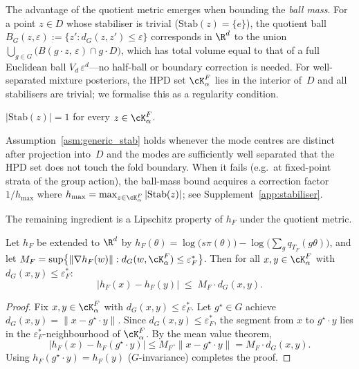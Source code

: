 The advantage of the quotient metric emerges when bounding the
\emph{ball mass}.  For a point $z \in D$ whose stabiliser is trivial
($\mathrm{Stab}(z) = \{e\}$), the quotient ball
$B_G(z, \varepsilon) := \{z' : d_G(z, z') \leq \varepsilon\}$
corresponds in $\R^d$ to the union
$\bigcup_{g \in G}\bigl(B(g\!\cdot\!z,\,\varepsilon) \cap g\!\cdot\!D\bigr)$,
which has total volume equal to that of a full Euclidean ball
$V_d\,\varepsilon^d$---no half-ball or boundary correction is
needed.  For well-separated mixture posteriors, the HPD set
$\cK_\alpha^F$ lies in the interior of~$D$ and all stabilisers are
trivial; we formalise this as a regularity condition.

\begin{assumption}\label{asm:generic_stab}
  $|\mathrm{Stab}(z)| = 1$ for every $z \in \cK_\alpha^F$.
\end{assumption}

\noindent
Assumption~\ref{asm:generic_stab} holds whenever the mode centres are
distinct after projection into~$D$ and the modes are sufficiently
well separated that the HPD set does not touch the fold boundary.
When it fails (e.g.\ at fixed-point strata of the group action),
the ball-mass bound acquires a correction factor
$1/h_{\max}$ where
$h_{\max} = \max_{z \in \cK_\alpha^F} |\mathrm{Stab}(z)|$;
see Supplement~\ref{app:stabiliser}.

The remaining ingredient is a Lipschitz property of $h_F$ under
the quotient metric.

\begin{lemma}\label{lem:lip_quotient}
  Let $h_F$ be extended to $\R^d$ by
  $h_F(\theta) = \log\bigl(s\pi(\theta)\bigr)
  - \log\bigl(\sum_g q_{T_F}(g\theta)\bigr)$,
  and let
  $M_F = \sup\bigl\{\|\nabla h_F(w)\| :
  d_G(w, \cK_\alpha^F) \leq \varepsilon_F^*\bigr\}$.
  Then for all $x, y \in \cK_\alpha^F$ with $d_G(x,y) \leq \varepsilon_F^*$:
  \begin{equation}\label{eq:lip_dG}
    |h_F(x) - h_F(y)| \;\leq\; M_F \cdot d_G(x, y).
  \end{equation}
\end{lemma}

\begin{proof}
  Fix $x, y \in \cK_\alpha^F$ with $d_G(x,y) \leq \varepsilon_F^*$.
  Let $g^\star \in G$ achieve
  $d_G(x,y) = \|x - g^\star \cdot y\|$.
  Since $d_G(x,y) \leq \varepsilon_F^*$, the segment from $x$
  to $g^\star \cdot y$ lies in the
  $\varepsilon_F^*$-neighbourhood of $\cK_\alpha^F$.
  By the mean value theorem,
  \[
    |h_F(x) - h_F(g^\star \cdot y)|
    \leq M_F \cdot \|x - g^\star \cdot y\|
    = M_F \cdot d_G(x,y).
  \]
  Using $h_F(g^\star \cdot y) = h_F(y)$ ($G$-invariance) completes
  the proof.
\end{proof}

